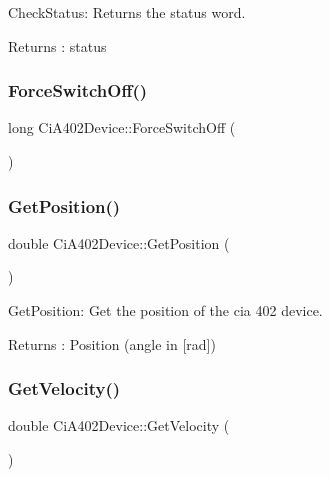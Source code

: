 Check\+Status\+: Returns the status word. 

\begin{DoxyReturn}{Returns}
\+: status 
\end{DoxyReturn}
\mbox{\label{classCiA402Device_aff0503b4caa6d2a8e2e66df6b9e0f4e4}} 
\subsubsection{\texorpdfstring{Force\+Switch\+Off()}{ForceSwitchOff()}}
{\footnotesize\ttfamily long Ci\+A402\+Device\+::\+Force\+Switch\+Off (\begin{DoxyParamCaption}{ }\end{DoxyParamCaption})}

\mbox{\label{classCiA402Device_ac8d9e36e6f457565cac7d26d91e4a712}} 
\subsubsection{\texorpdfstring{Get\+Position()}{GetPosition()}}
{\footnotesize\ttfamily double Ci\+A402\+Device\+::\+Get\+Position (\begin{DoxyParamCaption}{ }\end{DoxyParamCaption})}



Get\+Position\+: Get the position of the cia 402 device. 

\begin{DoxyReturn}{Returns}
\+: Position (angle in \mbox{[}rad\mbox{]}) 
\end{DoxyReturn}
\mbox{\label{classCiA402Device_a54b43f6429da4c6c0241653355e81d36}} 
\subsubsection{\texorpdfstring{Get\+Velocity()}{GetVelocity()}}
{\footnotesize\ttfamily double Ci\+A402\+Device\+::\+Get\+Velocity (\begin{DoxyParamCaption}{ }\end{DoxyParamCaption})}



